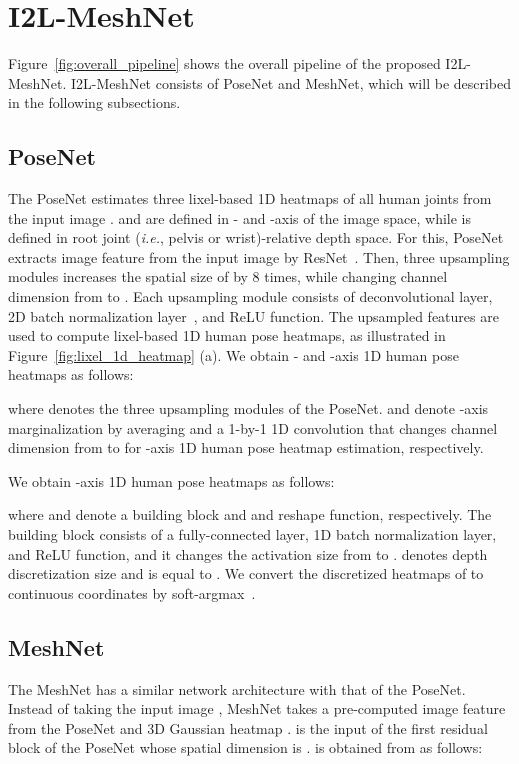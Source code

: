 \documentclass[runningheads]{llncs}
\begin{document}
\section{I2L-MeshNet}
Figure~\ref{fig:overall_pipeline} shows the overall pipeline of the proposed I2L-MeshNet.
I2L-MeshNet consists of PoseNet and MeshNet, which will be described in the following subsections.

\subsection{PoseNet}
The PoseNet estimates three lixel-based 1D heatmaps of all human joints  from the input image . 
 and  are defined in - and -axis of the image space, while  is defined in root joint (\textit{i.e.}, pelvis or wrist)-relative depth space.
For this, PoseNet extracts image feature  from the input image by ResNet~\cite{he2016deep}.
Then, three upsampling modules increases the spatial size of  by 8 times, while changing channel dimension from  to .
Each upsampling module consists of deconvolutional layer, 2D batch normalization layer~\cite{ioffe2015batch}, and ReLU function.
The upsampled features are used to compute lixel-based 1D human pose heatmaps, as illustrated in Figure~\ref{fig:lixel_1d_heatmap} (a).
We obtain - and -axis 1D human pose heatmaps as follows:

where  denotes the three upsampling modules of the PoseNet.
 and  denote -axis marginalization by averaging and a 1-by-1 1D convolution that changes channel dimension from  to  for -axis 1D human pose heatmap estimation, respectively.


We obtain -axis 1D human pose heatmaps as follows:

where  and  denote a building block and and reshape function, respectively.
The building block consists of a fully-connected layer, 1D batch normalization layer, and ReLU function, and it changes the activation size from  to .
 denotes depth discretization size and is equal to .
We convert the discretized heatmaps of  to continuous coordinates  by soft-argmax~\cite{sun2018integral}.

\subsection{MeshNet}
The MeshNet has a similar network architecture with that of the PoseNet.
Instead of taking the input image , MeshNet takes a pre-computed image feature from the PoseNet  and 3D Gaussian heatmap .
 is the input of the first residual block of the PoseNet whose spatial dimension is .
 is obtained from  as follows:
\end{document}
